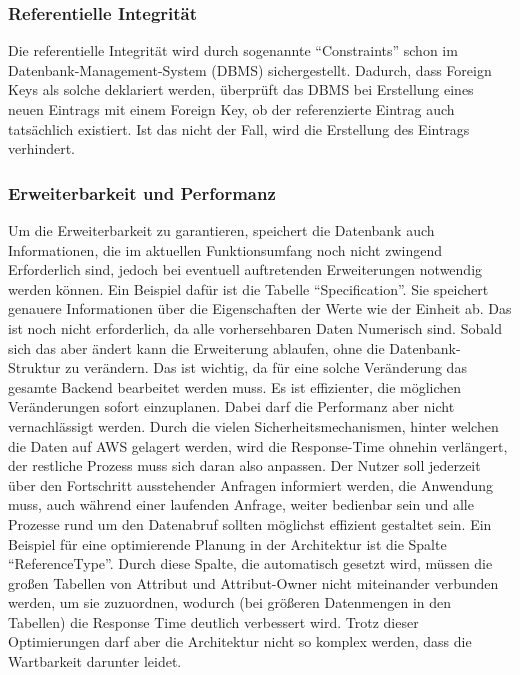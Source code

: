 \subsubsection{Referentielle Integrität}
Die referentielle Integrität wird durch sogenannte \enquote{Constraints} schon im Datenbank-Management-System (DBMS) sichergestellt.
Dadurch, dass Foreign Keys als solche deklariert werden, überprüft das DBMS bei Erstellung eines neuen Eintrags mit einem Foreign Key,
ob der referenzierte Eintrag auch tatsächlich existiert. Ist das nicht der Fall, wird die Erstellung des Eintrags verhindert.
\subsubsection{Erweiterbarkeit und Performanz}
Um die Erweiterbarkeit zu garantieren, speichert die Datenbank auch Informationen, die im aktuellen Funktionsumfang noch nicht zwingend Erforderlich sind,
jedoch bei eventuell auftretenden Erweiterungen notwendig werden können. Ein Beispiel dafür ist die Tabelle \enquote{Specification}. Sie speichert genauere Informationen
über die Eigenschaften der Werte wie der Einheit ab. Das ist noch nicht erforderlich, da alle vorhersehbaren Daten Numerisch sind. Sobald sich das aber ändert kann 
die Erweiterung ablaufen, ohne die Datenbank-Struktur zu verändern. Das ist wichtig, da für eine solche Veränderung das gesamte Backend bearbeitet werden muss. Es ist 
effizienter, die möglichen Veränderungen sofort einzuplanen. Dabei darf die Performanz aber nicht vernachlässigt werden. Durch die vielen Sicherheitsmechanismen, hinter welchen
die Daten auf AWS gelagert werden, wird die Response-Time ohnehin verlängert, der restliche Prozess muss sich daran also anpassen. Der Nutzer soll jederzeit über den Fortschritt
ausstehender Anfragen informiert werden, die Anwendung muss, auch während einer laufenden Anfrage, weiter bedienbar sein und alle Prozesse rund um den Datenabruf sollten möglichst 
effizient gestaltet sein. Ein Beispiel für eine optimierende Planung in der Architektur ist die Spalte \enquote{ReferenceType}. Durch diese Spalte, die automatisch gesetzt wird, müssen die großen
Tabellen von Attribut und Attribut-Owner nicht miteinander verbunden werden, um sie zuzuordnen, wodurch (bei größeren Datenmengen in den Tabellen) die Response Time deutlich verbessert wird.
Trotz dieser Optimierungen darf aber die Architektur nicht so komplex werden, dass die Wartbarkeit darunter leidet.
